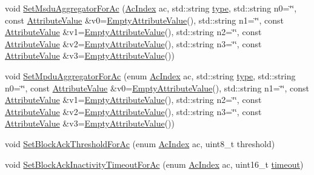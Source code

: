 \begin{DoxyCompactItemize}
\item 
void \hyperlink{classns3_1_1QosWifiMacHelper_a6583b6f3c5aee080a7b43a912ab07284}{Set\+Msdu\+Aggregator\+For\+Ac} (\hyperlink{group__wifi_gab422b4562ba272b39a9b6bca3513f3ac}{Ac\+Index} ac, std\+::string \hyperlink{visualizer-ideas_8txt_add98db9e15e2a58cf2b57623e7aa893a}{type}, std\+::string n0=\char`\"{}\char`\"{}, const \hyperlink{classns3_1_1AttributeValue}{Attribute\+Value} \&v0=\hyperlink{classns3_1_1EmptyAttributeValue}{Empty\+Attribute\+Value}(), std\+::string n1=\char`\"{}\char`\"{}, const \hyperlink{classns3_1_1AttributeValue}{Attribute\+Value} \&v1=\hyperlink{classns3_1_1EmptyAttributeValue}{Empty\+Attribute\+Value}(), std\+::string n2=\char`\"{}\char`\"{}, const \hyperlink{classns3_1_1AttributeValue}{Attribute\+Value} \&v2=\hyperlink{classns3_1_1EmptyAttributeValue}{Empty\+Attribute\+Value}(), std\+::string n3=\char`\"{}\char`\"{}, const \hyperlink{classns3_1_1AttributeValue}{Attribute\+Value} \&v3=\hyperlink{classns3_1_1EmptyAttributeValue}{Empty\+Attribute\+Value}())
\item 
void \hyperlink{classns3_1_1QosWifiMacHelper_a8d019e5c4f09179fab3a0c924f266244}{Set\+Mpdu\+Aggregator\+For\+Ac} (enum \hyperlink{group__wifi_gab422b4562ba272b39a9b6bca3513f3ac}{Ac\+Index} ac, std\+::string \hyperlink{visualizer-ideas_8txt_add98db9e15e2a58cf2b57623e7aa893a}{type}, std\+::string n0=\char`\"{}\char`\"{}, const \hyperlink{classns3_1_1AttributeValue}{Attribute\+Value} \&v0=\hyperlink{classns3_1_1EmptyAttributeValue}{Empty\+Attribute\+Value}(), std\+::string n1=\char`\"{}\char`\"{}, const \hyperlink{classns3_1_1AttributeValue}{Attribute\+Value} \&v1=\hyperlink{classns3_1_1EmptyAttributeValue}{Empty\+Attribute\+Value}(), std\+::string n2=\char`\"{}\char`\"{}, const \hyperlink{classns3_1_1AttributeValue}{Attribute\+Value} \&v2=\hyperlink{classns3_1_1EmptyAttributeValue}{Empty\+Attribute\+Value}(), std\+::string n3=\char`\"{}\char`\"{}, const \hyperlink{classns3_1_1AttributeValue}{Attribute\+Value} \&v3=\hyperlink{classns3_1_1EmptyAttributeValue}{Empty\+Attribute\+Value}())
\item 
void \hyperlink{classns3_1_1QosWifiMacHelper_add527c95883fa14d87e8cacae0c0b204}{Set\+Block\+Ack\+Threshold\+For\+Ac} (enum \hyperlink{group__wifi_gab422b4562ba272b39a9b6bca3513f3ac}{Ac\+Index} ac, uint8\+\_\+t threshold)
\item 
void \hyperlink{classns3_1_1QosWifiMacHelper_a4437c5a6f642a97799398f09fee00b7d}{Set\+Block\+Ack\+Inactivity\+Timeout\+For\+Ac} (enum \hyperlink{group__wifi_gab422b4562ba272b39a9b6bca3513f3ac}{Ac\+Index} ac, uint16\+\_\+t \hyperlink{openflow-switch_8cc_a386d174ae121d1cfa279074b7e209714}{timeout})
\end{DoxyCompactItemize}
